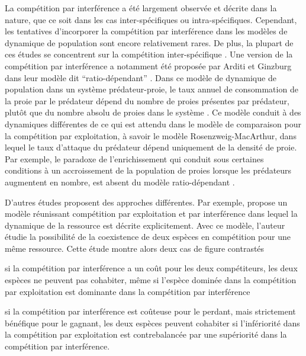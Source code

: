 La compétition par interférence a été largement observée et décrite dans la
nature, que ce soit dans les cas inter-spécifiques ou intra-spécifiques.
Cependant, les tentatives d'incorporer la compétition par interférence dans les
modèles de dynamique de population sont encore relativement rares. De plus, la
plupart de ces études se concentrent sur la compétition inter-spécifique
\autocites{case1974a, carothers1984a, vance1984a, adler2000a}. Une version de la
compétition par interférence a notamment été proposée par Arditi et Ginzburg
dans leur modèle dit ``ratio-dépendant''
\autocites{arditi1989a,arditi2012a,arditi1991a}.
Dans ce modèle de dynamique de population dans un système prédateur-proie, le
taux annuel de consommation de la proie par le prédateur dépend du nombre de
proies présentes par prédateur, plutôt que du nombre absolu de proies dans le
système \autocite[voir][pour les détails et dérivations du modèle]{arditi2012a}.
Ce modèle conduit à des dynamiques différentes de ce qui
est attendu dans le modèle de comparaison pour la compétition par exploitation,
à savoir le modèle Rosenzweig-MacArthur, dans lequel le taux d'attaque du
prédateur dépend uniquement de la densité de proie. Par exemple, le paradoxe de
l'enrichissement qui conduit sous certaines conditions à un accroissement de la
population de proies lorsque les prédateurs augmentent en nombre, est absent du
modèle ratio-dépendant \autocites{arditi2012a}. 

D'autres études proposent des approches différentes. Par exemple,
\textcite{amarasekare2002a} propose un modèle réunissant compétition par
exploitation et par interférence dans lequel la dynamique de la ressource est
décrite explicitement. Avec ce modèle, l'auteur étudie la possibilité de la
coexistence de deux espèces en compétition pour une même ressource. Cette étude
montre alors deux cas de figure contrastés \begin{enumerate*}[label=(\roman*),
before=\unskip{ : }, itemjoin={{ ; }}, itemjoin*={{ ; et }}] \item si la
compétition par interférence a un coût pour les deux compétiteurs, les deux
espèces ne peuvent pas cohabiter, même si l'espèce dominée dans la compétition
par exploitation est dominante dans la compétition par interférence \item si la
compétition par interférence est coûteuse pour le perdant, mais strictement
bénéfique pour le gagnant, les deux espèces peuvent cohabiter si l'infériorité
dans la compétition par exploitation est contrebalancée par une supériorité dans
la compétition par interférence. \end{enumerate*}


